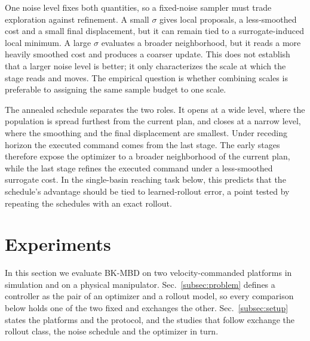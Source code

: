 \documentclass[letterpaper,10pt,conference]{ieeeconf}
\newcommand{\bkmbd}{\textsc{BK-MBD}}
\begin{document}
One noise level fixes both quantities, so a fixed-noise sampler must trade exploration against refinement.
A small $\sigma$ gives local proposals, a less-smoothed cost and a small final displacement, but it can remain tied to a surrogate-induced local minimum.
A large $\sigma$ evaluates a broader neighborhood, but it reads a more heavily smoothed cost and produces a coarser update.
This does not establish that a larger noise level is better; it only characterizes the scale at which the stage reads and moves.
The empirical question is whether combining scales is preferable to assigning the same sample budget to one scale.

The annealed schedule separates the two roles.
It opens at a wide level, where the population is spread furthest from the current plan, and closes at a narrow level, where the smoothing and the final displacement are smallest.
Under receding horizon the executed command comes from the last stage.
The early stages therefore expose the optimizer to a broader neighborhood of the current plan, while the last stage refines the executed command under a less-smoothed surrogate cost.
In the single-basin reaching task below, this predicts that the schedule's advantage should be tied to learned-rollout error, a point tested by repeating the schedules with an exact rollout.

\section{Experiments}\label{sec:exp}

In this section we evaluate \bkmbd{} on two velocity-commanded platforms in simulation and on a physical manipulator.
Sec.~\ref{subsec:problem} defines a controller as the pair of an optimizer and a rollout model, so every comparison below holds one of the two fixed and exchanges the other.
Sec.~\ref{subsec:setup} states the platforms and the protocol, and the studies that follow exchange the rollout class, the noise schedule and the optimizer in turn.
\end{document}
